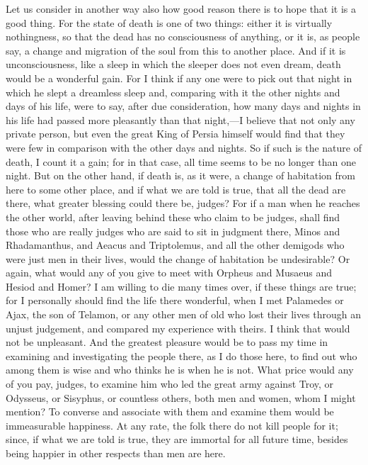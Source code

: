 \documentclass[letterpaper,12pt]{article}
\newcommand{\stephpag}[1]{\marginnote{\small\itshape\fontfamily{ppl}\selectfont #1}}
\begin{document}
Let us consider in another way also how good reason there is to hope that it is a good thing. For the state of death is one of two things: either it is virtually nothingness, so that the dead has no consciousness of anything, or it is, as people say, a change and migration of the soul from this to another place. And if it is unconsciousness, \stephpag{d} like a sleep in which the sleeper does not even dream, death would be a wonderful gain. For I think if any one were to pick out that night in which he slept a dreamless sleep and, comparing with it the other nights and days of his life, were to say, after due consideration, how many days and nights in his life had passed more pleasantly than that night,---I believe that not only any private person, but even the great King of Persia himself \stephpag{e} would find that they were few in comparison with the other days and nights. So if such is the nature of death, I count it a gain; for in that case, all time seems to be no longer than one night. But on the other hand, if death is, as it were, a change of habitation from here to some other place, and if what we are told is true, that all the dead are there, what greater blessing could there be, judges? For if a man when he reaches the other world, \stephpag{41 a} after leaving behind these who claim to be judges, shall find those who are really judges who are said to sit in judgment there, Minos and Rhadamanthus, and Aeacus and Triptolemus, and all the other demigods who were just men in their lives, would the change of habitation be undesirable? Or again, what would any of you give to meet with Orpheus and Musaeus and Hesiod and Homer? I am willing to die many times over, if these things are true; for I personally should find the life there wonderful, \stephpag{b} when I met Palamedes or Ajax, the son of Telamon, or any other men of old who lost their lives through an unjust judgement, and compared my experience with theirs. I think that would not be unpleasant. And the greatest pleasure would be to pass my time in examining and investigating the people there, as I do those here, to find out who among them is wise and who thinks he is when he is not. What price would any of you pay, judges, to examine him who led the great army against Troy, \stephpag{c} or Odysseus, or Sisyphus, or countless others, both men and women, whom I might mention? To converse and associate with them and examine them would be immeasurable happiness. At any rate, the folk there do not kill people for it; since, if what we are told is true, they are immortal for all future time, besides being happier in other respects than men are here.
\end{document}
